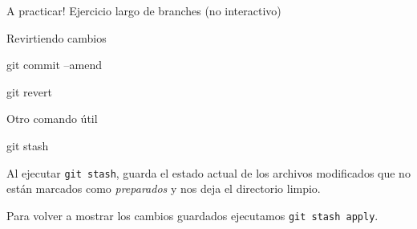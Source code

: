 \begin{frame}[t]{A practicar!}
    Ejercicio largo de branches (no interactivo)

\end{frame}

\begin{frame}[t]{Revirtiendo cambios}
    \begin{comando}
        git commit --amend
    \end{comando}


    \vspace{2em}

    \begin{comando}
        git revert
    \end{comando}

\end{frame}

\begin{frame}[t]{Otro comando útil}
    \begin{comando}
        git stash
    \end{comando}

    \pause
    \begin{block}{}
        Al ejecutar \texttt{git stash}, guarda el estado actual de los archivos modificados que no están marcados como \textit{preparados} y nos deja el directorio limpio.

        \vspace{0.5em}

        Para volver a mostrar los cambios guardados ejecutamos \texttt{git stash apply}.
    \end{block}
\end{frame}


